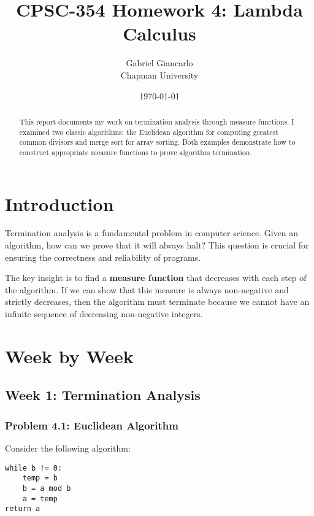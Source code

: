 \documentclass{article}
\title{CPSC-354 Homework 4: Lambda Calculus}
\author{Gabriel Giancarlo \\ Chapman University}
\date{\today}
\theoremstyle{plain}
\theoremstyle{definition}
\theoremstyle{remark}
\begin{document}
\maketitle

\begin{abstract}
This report documents my work on termination analysis through measure functions. I examined two classic algorithms: the Euclidean algorithm for computing greatest common divisors and merge sort for array sorting. Both examples demonstrate how to construct appropriate measure functions to prove algorithm termination.
\end{abstract}

\setcounter{tocdepth}{3}
\tableofcontents

\section{Introduction}\label{intro}

Termination analysis is a fundamental problem in computer science. Given an algorithm, how can we prove that it will always halt? This question is crucial for ensuring the correctness and reliability of programs. 

The key insight is to find a \textbf{measure function} that decreases with each step of the algorithm. If we can show that this measure is always non-negative and strictly decreases, then the algorithm must terminate because we cannot have an infinite sequence of decreasing non-negative integers.

\section{Week by Week}\label{homework}

\subsection{Week 1: Termination Analysis}

\subsubsection{Problem 4.1: Euclidean Algorithm}

Consider the following algorithm:

\begin{verbatim}
while b != 0:
    temp = b
    b = a mod b
    a = temp
return a
\end{verbatim}
\end{document}
